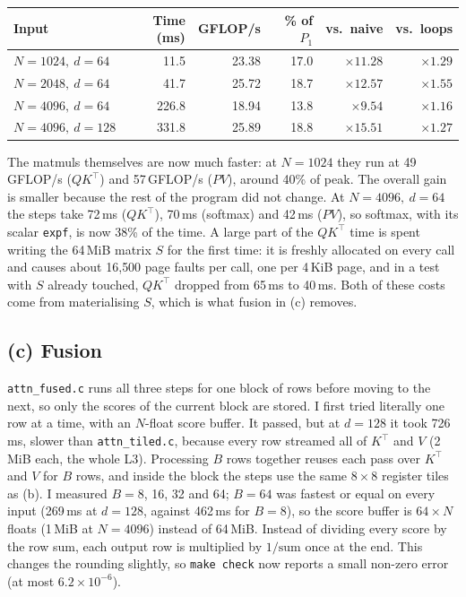 \documentclass[11pt,a4paper]{article}
\begin{document}
\begin{center}
\begin{tabular}{@{}lrrrrr@{}}
\toprule
Input & Time (ms) & GFLOP/s & \% of $P_1$ & vs.\ naive & vs.\ loops \\
\midrule
$N=1024,\ d=64$  & 11.5  & 23.38 & 17.0 & $\times11.28$ & $\times1.29$ \\
$N=2048,\ d=64$  & 41.7  & 25.72 & 18.7 & $\times12.57$ & $\times1.55$ \\
$N=4096,\ d=64$  & 226.8 & 18.94 & 13.8 & $\times9.54$  & $\times1.16$ \\
$N=4096,\ d=128$ & 331.8 & 25.89 & 18.8 & $\times15.51$ & $\times1.27$ \\
\bottomrule
\end{tabular}
\end{center}

The matmuls themselves are now much faster: at $N=1024$ they run at 49\,GFLOP/s ($QK^\top$) and
57\,GFLOP/s ($PV$), around 40\% of peak. The overall gain is smaller because the rest of the
program did not change. At $N=4096,\ d=64$ the steps take 72\,ms ($QK^\top$), 70\,ms (softmax)
and 42\,ms ($PV$), so softmax, with its scalar \texttt{expf}, is now 38\% of the time. A large
part of the $QK^\top$ time is spent writing the 64\,MiB matrix $S$ for the first time: it is
freshly allocated on every call and causes about 16{,}500 page faults per call, one per 4\,KiB
page, and in a test with $S$ already touched, $QK^\top$ dropped from 65\,ms to 40\,ms. Both of
these costs come from materialising $S$, which is what fusion in (c) removes.

\subsection*{(c) Fusion}

\texttt{attn\_fused.c} runs all three steps for one block of rows before moving to the next, so
only the scores of the current block are stored. I first tried literally one row at a time,
with an $N$-float score buffer. It passed, but at $d=128$ it took 726\,ms, slower than
\texttt{attn\_tiled.c}, because every row streamed all of $K^\top$ and $V$ (2\,MiB each, the
whole L3). Processing $B$ rows together reuses each pass over $K^\top$ and $V$ for $B$ rows, and
inside the block the steps use the same $8 \times 8$ register tiles as (b). I measured $B = 8$,
16, 32 and 64; $B=64$ was fastest or equal on every input (269\,ms at $d=128$, against 462\,ms
for $B=8$), so the score buffer is $64 \times N$ floats (1\,MiB at $N=4096$) instead of 64\,MiB.
Instead of dividing every score by the row sum, each output row is multiplied by $1/\text{sum}$
once at the end. This changes the rounding slightly, so \texttt{make check} now reports a small
non-zero error (at most $6.2\times10^{-6}$).
\end{document}
